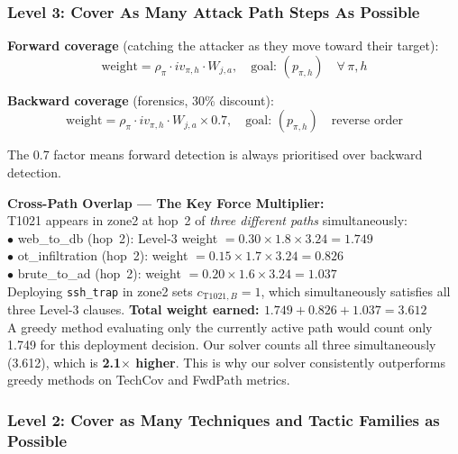 \documentclass[journal]{IEEEtran}
\begin{document}
\subsubsection{Level 3: Cover As Many Attack Path Steps
              As Possible}

\textbf{Forward coverage} (catching the attacker as they
move toward their target):
\begin{equation}
  \text{weight} = \rho_\pi \cdot iv_{\pi,h} \cdot W_{j,a},
  \quad \text{goal: } (p_{\pi,h})
  \quad \forall\,\pi, h
\end{equation}

\textbf{Backward coverage} (forensics, 30\% discount):
\begin{equation}
  \text{weight} = \rho_\pi \cdot iv_{\pi,h} \cdot W_{j,a}
  \times 0.7, \quad \text{goal: } (p_{\pi,h})
  \quad \text{reverse order}
\end{equation}

The 0.7 factor means forward detection is always prioritised
over backward detection.

\begin{examplebox}
\textbf{Cross-Path Overlap --- The Key Force Multiplier:}\\[3pt]
T1021 appears in zone2 at hop~2 of \emph{three different paths}
simultaneously:\\
\hspace*{10pt}$\bullet$ web\_to\_db (hop~2): Level-3 weight
$= 0.30\times1.8\times3.24 = 1.749$\\
\hspace*{10pt}$\bullet$ ot\_infiltration (hop~2): weight
$= 0.15\times1.7\times3.24 = 0.826$\\
\hspace*{10pt}$\bullet$ brute\_to\_ad (hop~2): weight
$= 0.20\times1.6\times3.24 = 1.037$\\[3pt]
Deploying \texttt{ssh\_trap} in zone2 sets
$c_{\text{T1021},B}=1$, which simultaneously satisfies all
three Level-3 clauses.
\textbf{Total weight earned: $1.749+0.826+1.037=3.612$}\\[3pt]
A greedy method evaluating only the currently active path
would count only 1.749 for this deployment decision.
Our solver counts all three simultaneously (3.612),
which is \textbf{2.1$\times$ higher}.
This is why our solver consistently outperforms greedy
methods on TechCov and FwdPath metrics.
\end{examplebox}

\subsubsection{Level 2: Cover as Many Techniques and
              Tactic Families as Possible}
\end{document}
